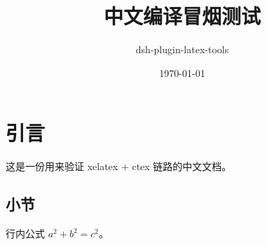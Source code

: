 \documentclass[UTF8]{ctexart}
\title{中文编译冒烟测试}
\author{dsh-plugin-latex-tools}
\date{\today}
\begin{document}
\maketitle

\section{引言}
\label{sec:zh-intro}
这是一份用来验证 xelatex + ctex 链路的中文文档。

\subsection{小节}
行内公式 $a^2 + b^2 = c^2$。
\end{document}
